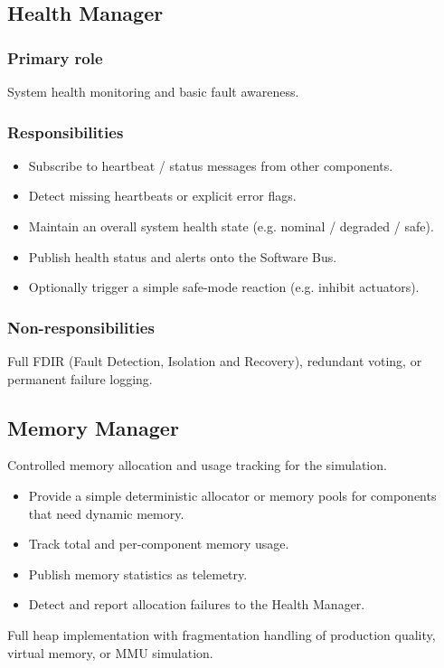 \documentclass[11pt,a4paper]{article}
\begin{document}
\subsection{Health Manager}
\subsubsection*{Primary role}
System health monitoring and basic fault awareness.
\subsubsection*{Responsibilities}
\begin{itemize}
\item Subscribe to heartbeat / status messages from other components.
\item Detect missing heartbeats or explicit error flags.
\item Maintain an overall system health state (e.g. nominal / degraded / safe).
\item Publish health status and alerts onto the Software Bus.
\item Optionally trigger a simple safe-mode reaction (e.g. inhibit actuators).
\end{itemize}
\subsubsection*{Non-responsibilities}
Full FDIR (Fault Detection, Isolation and Recovery), redundant voting, or permanent failure logging.

\subsection{Memory Manager}
\begin{description}[style=nextline, leftmargin=1.5em]
    \item[Primary role] Controlled memory allocation and usage tracking for the simulation.
    \item[Responsibilities]
    \begin{itemize}
        \item Provide a simple deterministic allocator or memory pools for components that need dynamic memory.
        \item Track total and per-component memory usage.
        \item Publish memory statistics as telemetry.
        \item Detect and report allocation failures to the Health Manager.
    \end{itemize}
    \item[Non-responsibilities] Full heap implementation with fragmentation handling of production quality, virtual memory, or MMU simulation.
\end{description}
\end{document}
